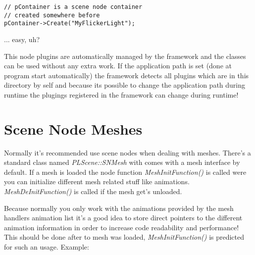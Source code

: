 \begin{lstlisting}[caption=Creating an instance of an own scene node class]
// pContainer is a scene node container
// created somewhere before
pContainer->Create("MyFlickerLight");
\end{lstlisting}

... easy, uh?

This node plugins are automatically managed by the framework and the classes can be used without any extra work. If the application path is set (done at program start automatically) the framework detects all plugins which are in this directory by self and because its possible to change the application path during runtime the plugings registered in the framework can change during runtime!




\section{Scene Node Meshes}
Normally it's recommended use scene nodes when dealing with meshes. There's a standard class named \emph{PLScene::SNMesh} with comes with a mesh interface by default. If a mesh is loaded the node function \emph{MeshInitFunction()} is called were you can initialize different mesh related stuff like animations. \emph{MeshDeInitFunction()} is called if the mesh get's unloaded.

Because normally you only work with the animations provided by the mesh handlers animation list it's a good idea to store direct pointers to the different animation information in order to increase code readability and performance! This should be done after to mesh was loaded, \emph{MeshInitFunction()} is predicted for such an usage. Example:

